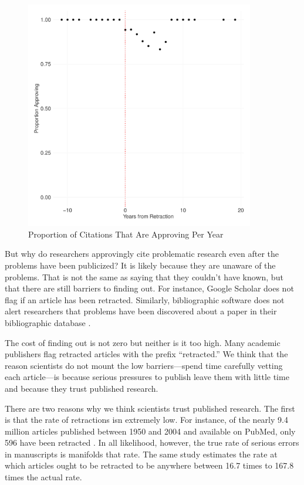 \documentclass[12pt]{article}
\begin{document}
\begin{figure}[t]
\centering
\includegraphics[width=10cm]{../figs/pre_post_prop_approving.pdf}
\caption{Proportion of Citations That Are Approving Per Year}
\label{fig:prop_approving_per_year}
\end{figure}

But why do researchers approvingly cite problematic research even after the problems have been publicized? It is likely because they are unaware of the problems. That is not the same as saying that they couldn't have known, but that there are still barriers to finding out. For instance, Google Scholar does not flag if an article has been retracted. Similarly, bibliographic software does not alert researchers that problems have been discovered about a paper in their bibliographic database \cite{davis2012persistence}. 

The cost of finding out is not zero but neither is it too high. Many academic publishers flag retracted articles with the prefix ``retracted.'' We think that the reason scientists do not mount the low barriers---spend time carefully vetting each article---is because serious pressures to publish leave them with little time and because they trust published research. 

There are two reasons why we think scientists trust published research. The first is that the rate of retractions isn extremely low. For instance, of the nearly 9.4 million articles published between 1950 and 2004 and available on PubMed, only 596 have been retracted \cite{cokol2007many}. In all likelihood, however, the true rate of serious errors in manuscripts is manifolds that rate. The same study estimates the rate at which articles ought to be retracted to be anywhere between 16.7 times to 167.8 times the actual rate. 
\end{document}
